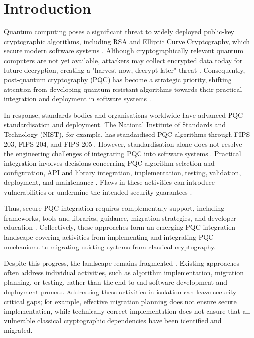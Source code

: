 \documentclass[letterpaper,twocolumn,10pt]{article}
\begin{document}
\section{Introduction}
\label{introduction}

Quantum computing poses a significant threat to widely deployed public-key cryptographic algorithms, including RSA and Elliptic Curve Cryptography, which secure modern software systems \cite{bernstein_post-quantum_2017, GILL20261}. Although cryptographically relevant quantum computers are not yet available, attackers may collect encrypted data today for future decryption, creating a "harvest now, decrypt later" threat \cite{bernardone2026quantum, giron_migrating_2023, Ana_huelsing2021wireguard}. Consequently, post-quantum cryptography (PQC) has become a strategic priority, shifting attention from developing quantum-resistant algorithms towards their practical integration and deployment in software systems \cite{bernstein_post-quantum_2017}.

In response, standards bodies and organisations worldwide have advanced PQC standardisation and deployment. The National Institute of Standards and Technology (NIST), for example, has standardised PQC algorithms through FIPS 203, FIPS 204, and FIPS 205 \cite{nist_pqc,nist_fips_203_2024,nist_fips_204_2024,nist_fips_205_2024}. However, standardisation alone does not resolve the engineering challenges of integrating PQC into software systems \cite{NISTTheoryReview}. Practical integration involves decisions concerning PQC algorithm selection and configuration, API and library integration, implementation, testing, validation, deployment, and maintenance \cite{howe_sok_2021, Ana_hekkala_implementing_2023, toruan2026security}. Flaws in these activities can introduce vulnerabilities or undermine the intended security guarantees \cite{howe_sok_2021, Ana_hekkala_implementing_2023, toruan2026security}. 

Thus, secure PQC integration requires complementary support, including frameworks, tools and libraries, guidance, migration strategies, and developer education \cite{Ana_hekkala_implementing_2023, ahmed_survey_2025, migration_Comparison, naether_migrating_2024, Ana_borrelli_towards_2025}. Collectively, these approaches form an emerging PQC integration landscape covering activities from implementing and integrating PQC mechanisms to migrating existing systems from classical cryptography. 

Despite this progress, the landscape remains fragmented \cite{anonymous_pqc_sok_2026}. Existing approaches \cite{Ana_huelsing2021wireguard, Ana_MigFrameOrg, Ana_MigFrDepen} often address individual activities, such as algorithm implementation, migration planning, or testing, rather than the end-to-end software development and deployment process. Addressing these activities in isolation can leave security-critical gaps; for example, effective migration planning does not ensure secure implementation, while technically correct implementation does not ensure that all vulnerable classical cryptographic dependencies have been identified and migrated.
\end{document}
